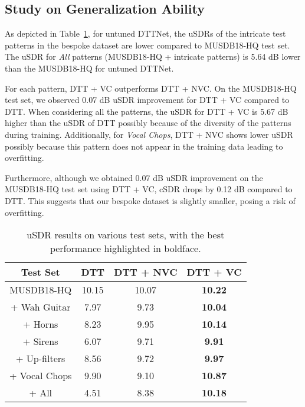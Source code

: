 \subsection{Study on Generalization Ability}
As depicted in Table~\ref{tbl:gen}, for untuned DTTNet, the uSDRs of the intricate test patterns in the bespoke dataset are lower compared to MUSDB18-HQ test set. The uSDR for \textit{All} patterns (MUSDB18-HQ + intricate patterns) is 5.64 dB lower than the MUSDB18-HQ for untuned DTTNet. 


For each pattern, DTT + VC outperforms DTT + NVC. On the MUSDB18-HQ test set, we observed 0.07 dB uSDR improvement for DTT + VC compared to DTT. When considering all the patterns, the uSDR for DTT + VC is 5.67 dB higher than the uSDR of DTT possibly because of the diversity of the patterns during training. Additionally, for \textit{Vocal Chops}, DTT + NVC shows lower uSDR possibly because this pattern does not appear in the training data leading to overfitting.

Furthermore, although we obtained 0.07 dB uSDR improvement on the MUSDB18-HQ test set using DTT + VC, cSDR drops by 0.12 dB compared to DTT. This suggests that our bespoke dataset is slightly smaller, posing a risk of overfitting.








\begin{table}[h]
    \centering
    \caption{uSDR results on various test sets, with the best performance highlighted in boldface.}\label{tbl:gen}
    \begin{adjustbox}{width=0.45\textwidth}
    \begin{tabular}{cccc}\hline


        Test Set &DTT &DTT + NVC &DTT + VC\\\hline



MUSDB18-HQ & 10.15 & 10.07 & \textbf{10.22} \\ 
+ Wah Guitar & 7.97 & 9.73 & \textbf{10.04} \\ 
+ Horns & 8.23 & 9.95 & \textbf{10.14} \\ 
+ Sirens & 6.07 & 9.71 & \textbf{9.91} \\ 
+ Up-filters & 8.56 & 9.72 & \textbf{9.97} \\ 
+ Vocal Chops & 9.90 & 9.10 & \textbf{10.87} \\ 
+ All & 4.51 & 8.38 & \textbf{10.18} \\ 
\hline
    \end{tabular}
    \end{adjustbox}
	
\end{table}

